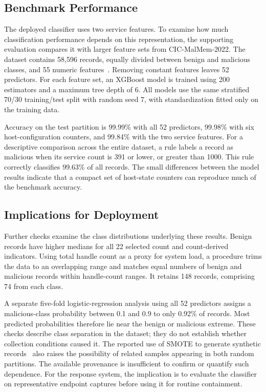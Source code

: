 \documentclass[conference]{IEEEtran}
\begin{document}
\subsection{Benchmark Performance}
The deployed classifier uses two service features. To examine how much
classification performance depends on this representation, the supporting
evaluation compares it with larger feature sets from CIC-MalMem-2022.
The dataset contains 58{,}596 records, equally divided between benign and
malicious classes, and 55 numeric features~\cite{carrier2022,cicmalmem}.
Removing constant features leaves 52 predictors. For each feature set,
an XGBoost model is trained using 200 estimators and a maximum tree depth
of 6. All models use the same stratified 70/30 training/test split with
random seed 7, with standardization fitted only on the training data.

Accuracy on the test partition is 99.99\% with all 52 predictors, 99.98\%
with six host-configuration counters, and 99.84\% with the two service
features. For a descriptive comparison across the entire dataset, a rule
labels a record as malicious when its service count is 391 or lower, or
greater than 1000. This rule correctly classifies 99.63\% of all records.
The small differences between the model results indicate that a compact
set of host-state counters can reproduce much of the benchmark accuracy.

\subsection{Implications for Deployment}
Further checks examine the class distributions underlying these results.
Benign records have higher medians for all 22 selected count and count-derived
indicators. Using total handle count as a proxy for system load, a procedure
trims the data to an overlapping range and matches equal numbers of benign
and malicious records within handle-count ranges. It retains 148 records,
comprising 74 from each class.

A separate five-fold logistic-regression analysis using all 52 predictors
assigns a malicious-class probability between 0.1 and 0.9 to only 0.92\% of
records. Most predicted probabilities therefore lie near the benign or
malicious extreme. These checks describe class separation in the dataset;
they do not establish whether collection conditions caused it. The reported
use of SMOTE to generate synthetic records~\cite{carrier2022} also raises
the possibility of related samples appearing in both random partitions.
The available provenance is insufficient to confirm or quantify such dependence.
For the response system, the implication is to evaluate the classifier on
representative endpoint captures before using it for routine containment.
\end{document}
